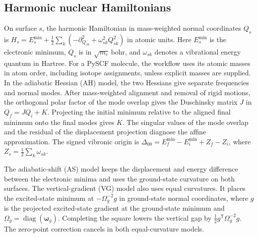 \subsection{Harmonic nuclear Hamiltonians}

On surface $s$, the harmonic Hamiltonian in mass-weighted normal coordinates
$Q_s$ is $H_s=E_s^{\min}+\tfrac12\sum_k(-\partial_{Q_{sk}}^2+\omega_{sk}^2 Q_{sk}^2)$
in atomic units. Here $E_s^{\min}$ is the electronic minimum, $Q_s$ is in
$\sqrt{m_e}\,\mathrm{bohr}$, and $\omega_{sk}$ denotes a vibrational energy
quantum in Hartree. For a PySCF molecule, the workflow uses its atomic
masses in atom order, including isotope assignments, unless explicit
masses are supplied. In the adiabatic Hessian (AH) model, the two Hessians
give separate frequencies and normal modes. After mass-weighted alignment
and removal of rigid motions, the orthogonal polar factor of the mode
overlap gives the Duschinsky matrix $J$ in $Q_f=JQ_i+K$. Projecting the
initial minimum relative to the aligned final minimum onto the final
modes gives $K$. The singular values of the mode overlap and the residual
of the displacement projection diagnose the affine approximation. The
signed vibronic origin is $\Delta_{00}=E_f^{\min}-E_i^{\min}+Z_f-Z_i$,
where $Z_s=\tfrac12\sum_k\omega_{sk}$.\cite{santoro}

The adiabatic-shift (AS) model keeps the displacement and energy difference
between the electronic minima and uses the ground-state curvature on both
surfaces. The vertical-gradient (VG) model also uses equal curvatures. It
places the excited-state minimum at $-\Omega_g^{-2}g$ in ground-state normal
coordinates, where $g$ is the projected excited-state gradient at the
ground-state minimum and $\Omega_g=\operatorname{diag}(\boldsymbol\omega_g)$.
Completing the square lowers the vertical gap by
$\tfrac12 g^{\mathsf T}\Omega_g^{-2}g$. The zero-point correction cancels in
both equal-curvature models.

